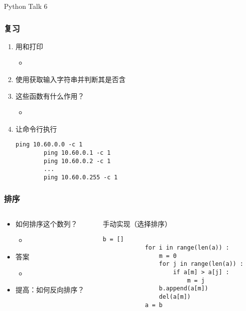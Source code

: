 


\begin{CJK}{UTF8}{gbsn}

\PreFirstFrame
\begin{frame} [fragile]
	\centerline{\fontsize{42}{42}\selectfont Python Talk 6}
\end{frame}
\PostFirstFrame

\begin{frame} [fragile]
	\frametitle{复习}
	\linespread{1.25}
	\begin{enumerate}
	\item 用和打印
		\begin{itemize}
		\item {}
		\end{itemize}
	\item 使用获取输入字符串并判断其是否含
	\item 这些函数有什么作用？
		\begin{itemize}
		\item {}
		\end{itemize}
	\item 让命令行执行
		\begin{lstlisting}[basicstyle=\ttfamily]
		ping 10.60.0.0 -c 1
		ping 10.60.0.1 -c 1
		ping 10.60.0.2 -c 1
		...
		ping 10.60.0.255 -c 1
		\end{lstlisting}
	\end{enumerate}
\end{frame}

\begin{frame} [fragile]
	\frametitle{排序}
	\linespread{1.25}
	\begin{columns}[T]
		\begin{column}[T]{.5\textwidth}
			\begin{itemize}
			\item 如何排序这个数列？
				\begin{itemize}
				\item {}
				\end{itemize}
			\item 答案
				\begin{itemize}
				\item {}
				\end{itemize}
			\item 提高：如何反向排序？
			\end{itemize}
		\end{column}
		\begin{column}[T]{.5\textwidth}
			手动实现（选择排序）
			\footnotesize
			\begin{lstlisting}[style=pythonstyle, gobble=12]
			b = []
			for i in range(len(a)) :
				m = 0
				for j in range(len(a)) :
					if a[m] > a[j] :
						m = j
				b.append(a[m])
				del(a[m])
			a = b
			\end{lstlisting}
		\end{column}
	\end{columns}
\end{frame}


\end{CJK}
